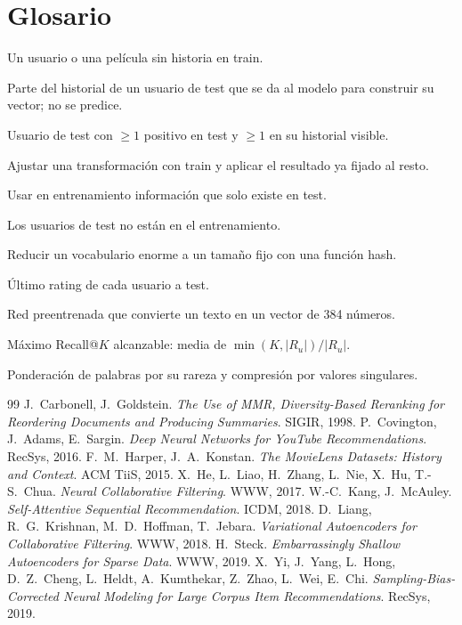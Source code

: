 \documentclass[a4paper,11pt]{article}
\begin{document}
\section*{Glosario}
\begin{description}[leftmargin=3.2cm, style=nextline, itemsep=1pt]
  \item[Arranque en frío] Un usuario o una película sin historia en train.
  \item[Contexto / \emph{fold-in}] Parte del historial de un usuario de test que se da al modelo para construir su vector; no se predice.
  \item[Elegible] Usuario de test con $\ge1$ positivo en test y $\ge1$ en su historial visible.
  \item[\emph{Fit/transform}] Ajustar una transformación con train y aplicar el resultado ya fijado al resto.
  \item[Fuga (\emph{leakage})] Usar en entrenamiento información que solo existe en test.
  \item[Generalización fuerte] Los usuarios de test no están en el entrenamiento.
  \item[\emph{Hashing}] Reducir un vocabulario enorme a un tamaño fijo con una función hash.
  \item[\emph{Leave-last-out}] Último rating de cada usuario a test.
  \item[MiniLM] Red preentrenada que convierte un texto en un vector de 384 números.
  \item[Techo de Recall@$K$] Máximo Recall@$K$ alcanzable: media de $\min(K,|R_u|)/|R_u|$.
  \item[TF-IDF / SVD] Ponderación de palabras por su rareza y compresión por valores singulares.
\end{description}

\begin{thebibliography}{99}
 J.~Carbonell, J.~Goldstein. \emph{The Use of MMR, Diversity-Based Reranking for Reordering Documents and Producing Summaries}. SIGIR, 1998.
 P.~Covington, J.~Adams, E.~Sargin. \emph{Deep Neural Networks for YouTube Recommendations}. RecSys, 2016.
 F.~M.~Harper, J.~A.~Konstan. \emph{The MovieLens Datasets: History and Context}. ACM TiiS, 2015.
 X.~He, L.~Liao, H.~Zhang, L.~Nie, X.~Hu, T.-S.~Chua. \emph{Neural Collaborative Filtering}. WWW, 2017.
 W.-C.~Kang, J.~McAuley. \emph{Self-Attentive Sequential Recommendation}. ICDM, 2018.
 D.~Liang, R.~G.~Krishnan, M.~D.~Hoffman, T.~Jebara. \emph{Variational Autoencoders for Collaborative Filtering}. WWW, 2018.
 H.~Steck. \emph{Embarrassingly Shallow Autoencoders for Sparse Data}. WWW, 2019.
 X.~Yi, J.~Yang, L.~Hong, D.~Z.~Cheng, L.~Heldt, A.~Kumthekar, Z.~Zhao, L.~Wei, E.~Chi. \emph{Sampling-Bias-Corrected Neural Modeling for Large Corpus Item Recommendations}. RecSys, 2019.
\end{thebibliography}
\end{document}
